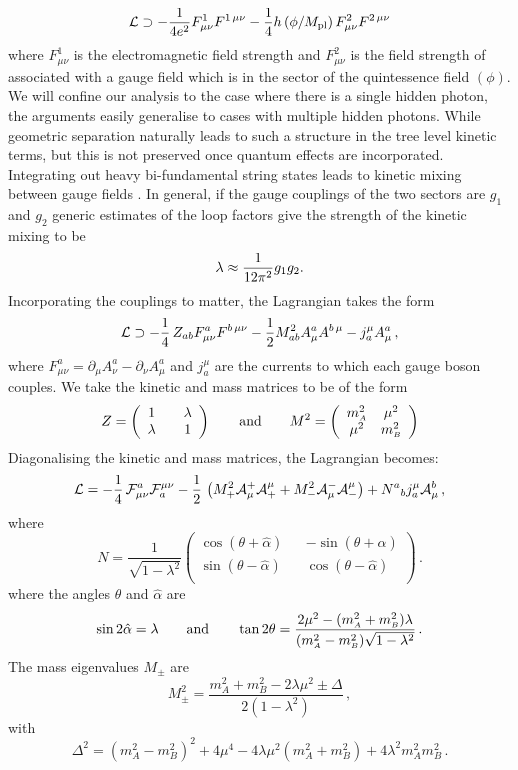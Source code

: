 \documentclass[11pt,a4paper]{article}
\newcommand{\halpha}{\hat{\alpha}}
\newcommand{\be}{\begin{equation}}
\newcommand{\ee}{\end{equation}}
\newcommand{\ma}{m_{\scriptscriptstyle A}}
\newcommand{\mb}{m_{\scriptscriptstyle B}}
\def\bel#1{\begin{equation} \label{#1}}
\begin{document}
$$
  \mathcal{L}  \supset  - {1 \over 4 e^2} F^{1}_{\mu \nu} F^{1 \,\mu \nu} -  {1 \over 4 } h \left({ \phi / M_{\rm pl}}\right)F^2_{\mu \nu} F^{2 \, \mu \nu}
$$
%      
where $F_{\mu \nu}^{1}$ is the electromagnetic field strength and $F_{\mu \nu}^{2}$ is the field strength of associated with a gauge field which is in the sector of the quintessence field $(\phi)$. We will confine our analysis to the case where there is a single hidden photon, the arguments easily generalise to cases with multiple hidden photons. While geometric separation naturally leads to such a structure in the tree level kinetic terms, but this is not preserved once quantum effects are incorporated. Integrating out heavy bi-fundamental string states leads to kinetic mixing between gauge fields \cite{Holdom:1985ag, Dienes:1996zr, Abel:2008ai}. In general, if the gauge couplings of the 
 two sectors are $g_{1}$ and $g_2$ generic estimates of the loop factors give the strength of the kinetic mixing to be
%
\bel{strmix}
    \lambda \approx {1 \over 12 \pi^2 }g_1 g_2.
\ee
%
Incorporating the couplings to matter, the Lagrangian takes the form
%
\bel{matcoup}
    {\cal L} \supset - \frac14 \, Z_{ab} F^a_{\mu\nu} F^{b\,\mu\nu}
    - {1 \over 2} M^2_{ab} A^a_{\mu} A^{b\,\mu} - j^\mu_a A^a_\mu \,,
\ee
%
where $F^a_{\mu\nu} = \partial_\mu A^a_\nu - \partial_\nu A^a_\mu$
and $j^\mu_a$  are the currents to which each gauge boson
couples. We take the kinetic and mass matrices to be of the form
%
\bel{matri}
    Z = \left(%
    \begin{array}{ccc}
    1 && \lambda \\
    \lambda && 1 \\
    \end{array}%
    \right) \qquad \hbox{and}\qquad
    M^2 = \left(%
    \begin{array}{cc}
    \ma^2 & \mu^2 \\
    \mu^2 & \mb^2 \\
    \end{array}%
    \right)
\ee
%
Diagonalising the kinetic and mass matrices, the Lagrangian becomes:
%
\bel{lfinal}
    {\cal L} = -\frac14 \, {\cal F}^a_{\mu\nu} {\cal F}^{\mu\nu}_a
    - \frac12 \, \left( M_+^2 {\cal A}^+_\mu {\cal A}^\mu_+
    + M_-^2 {\cal A}^-_\mu {\cal A}_-^\mu \right)
    + {N^a}_b j^\mu_a {\cal A}^b_\mu \,,
\ee
%
where 
%
\bel{nmatrix}
    N = \frac{1}{\sqrt{1-\lambda^2}} \left(%
    \begin{array}{ccc}
    \cos(\theta+\halpha) && -\sin(\theta + \halpha) \\
    \sin(\theta-\halpha) && \cos(\theta - \halpha) \\
    \end{array}%
    \right) \,.
\ee
%
where the angles $\theta$ and $\halpha$ are 
%
\be
    \sin 2\halpha = \lambda \qquad \hbox{and} \qquad
    \tan 2\theta = \frac{2\mu^2 - (\ma^2 + \mb^2)
    \lambda}{(\ma^2 - \mb^2) \sqrt{1-\lambda^2}} \,.
\ee
%
The mass eigenvalues $M_{\pm}$ are
%
\be
    M^2_{\pm} = \frac{\ma^2 + \mb^2 - 2 \lambda \mu^2
    \pm \Delta}{2(1 - \lambda^2)} \,,
\ee
%
with
%
\be
    \Delta^2 = (\ma^2 - \mb^2)^2 + 4\mu^4 - 4\lambda \mu^2 (\ma^2
    + \mb^2) + 4\lambda^2 \ma^2 \mb^2 \,.
\ee
%
\end{document}
